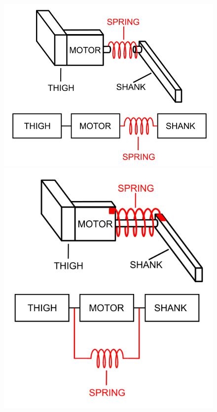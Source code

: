\begin{figure}[htbp]
    \centering
    \begin{minipage}[t]{0.45\textwidth}
        \vspace{0pt}%
        \centering
        \includegraphics[width=\textwidth]{Images/series_elastic_inkscape.png}
    \end{minipage}
    \hfill
    \begin{minipage}[t]{0.45\textwidth}
        \vspace{0pt}%
        \centering
        \includegraphics[width=\textwidth]{Images/parallell_spring_inkscape.png}

\end{minipage}
\end{figure}
